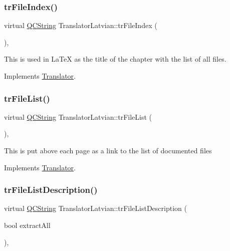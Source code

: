 \subsubsection{\texorpdfstring{trFileIndex()}{trFileIndex()}}
{\footnotesize\ttfamily virtual \mbox{\hyperlink{class_q_c_string}{Q\+C\+String}} Translator\+Latvian\+::tr\+File\+Index (\begin{DoxyParamCaption}{ }\end{DoxyParamCaption})\hspace{0.3cm}{\ttfamily [inline]}, {\ttfamily [virtual]}}

This is used in La\+TeX as the title of the chapter with the list of all files. 

Implements \mbox{\hyperlink{class_translator}{Translator}}.

\mbox{\label{class_translator_latvian_a9989ea77a5b895a8c0cc664a3554472d}} 
\subsubsection{\texorpdfstring{trFileList()}{trFileList()}}
{\footnotesize\ttfamily virtual \mbox{\hyperlink{class_q_c_string}{Q\+C\+String}} Translator\+Latvian\+::tr\+File\+List (\begin{DoxyParamCaption}{ }\end{DoxyParamCaption})\hspace{0.3cm}{\ttfamily [inline]}, {\ttfamily [virtual]}}

This is put above each page as a link to the list of documented files 

Implements \mbox{\hyperlink{class_translator}{Translator}}.

\mbox{\label{class_translator_latvian_adc3822bdbeb4f1d3b5a34bef746d519d}} 
\subsubsection{\texorpdfstring{trFileListDescription()}{trFileListDescription()}}
{\footnotesize\ttfamily virtual \mbox{\hyperlink{class_q_c_string}{Q\+C\+String}} Translator\+Latvian\+::tr\+File\+List\+Description (\begin{DoxyParamCaption}\item[{bool}]{extract\+All }\end{DoxyParamCaption})\hspace{0.3cm}{\ttfamily [inline]}, {\ttfamily [virtual]}}

